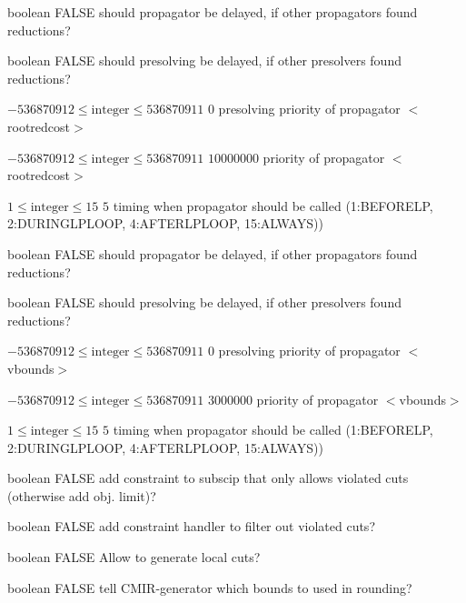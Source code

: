 %
{boolean}%
{FALSE}%
{should propagator be delayed, if other propagators found reductions?}%
{}

%
{boolean}%
{FALSE}%
{should presolving be delayed, if other presolvers found reductions?}%
{}

%
{$-536870912\leq\textrm{integer}\leq536870911$}%
{$0$}%
{presolving priority of propagator $<$rootredcost$>$}%
{}

%
{$-536870912\leq\textrm{integer}\leq536870911$}%
{$10000000$}%
{priority of propagator $<$rootredcost$>$}%
{}

%
{$1\leq\textrm{integer}\leq15$}%
{$5$}%
{timing when propagator should be called (1:BEFORELP, 2:DURINGLPLOOP, 4:AFTERLPLOOP, 15:ALWAYS))}%
{}

%
{boolean}%
{FALSE}%
{should propagator be delayed, if other propagators found reductions?}%
{}

%
{boolean}%
{FALSE}%
{should presolving be delayed, if other presolvers found reductions?}%
{}

%
{$-536870912\leq\textrm{integer}\leq536870911$}%
{$0$}%
{presolving priority of propagator $<$vbounds$>$}%
{}

%
{$-536870912\leq\textrm{integer}\leq536870911$}%
{$3000000$}%
{priority of propagator $<$vbounds$>$}%
{}

%
{$1\leq\textrm{integer}\leq15$}%
{$5$}%
{timing when propagator should be called (1:BEFORELP, 2:DURINGLPLOOP, 4:AFTERLPLOOP, 15:ALWAYS))}%
{}

%
{boolean}%
{FALSE}%
{add constraint to subscip that only allows violated cuts (otherwise add obj. limit)?}%
{}

%
{boolean}%
{FALSE}%
{add constraint handler to filter out violated cuts?}%
{}

%
{boolean}%
{FALSE}%
{Allow to generate local cuts?}%
{}

%
{boolean}%
{FALSE}%
{tell CMIR-generator which bounds to used in rounding?}%
{}

